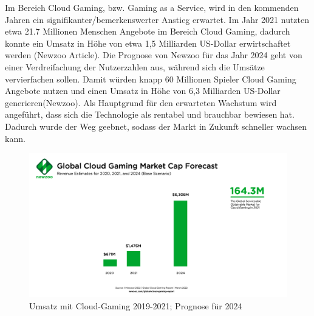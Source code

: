\documentclass[12pt,toc=bib,toc=listof]{scrreprt}
\begin{document}
Im Bereich Cloud Gaming, bzw. Gaming as a Service, wird in den kommenden Jahren ein signifikanter/bemerkenswerter
 Anstieg erwartet. Im Jahr 2021 nutzten etwa 21.7 Millionen Menschen Angebote im Bereich Cloud Gaming, dadurch konnte ein
 Umsatz in Höhe von etwa 1,5 Milliarden US-Dollar erwirtschaftet werden (Newzoo Article). Die Prognose von Newzoo für das Jahr 
 2024 geht von einer Verdreifachung der Nutzerzahlen aus, während sich die Umsätze vervierfachen sollen. Damit würden knapp 60
 Millionen Spieler Cloud Gaming Angebote nutzen und einen Umsatz in Höhe von 6,3 Milliarden US-Dollar generieren(Newzoo). Als Hauptgrund für den erwarteten Wachstum wird angeführt, dass sich die Technologie als rentabel und brauchbar bewiesen hat. Dadurch wurde der Weg geebnet, sodass 
 der Markt in Zukunft schneller wachsen kann.
\\%
\begin{figure}[h]
 \centering
  \includegraphics[scale=0.12]{Abbildungen/Newzoo_Global_Cloud_Gaming_Market_Cap_Forecast_March2022.png} 
  \caption[Newzoo]{Umsatz mit Cloud-Gaming 2019-2021; Prognose für 2024}
\end{figure}
\\%
\end{document}
